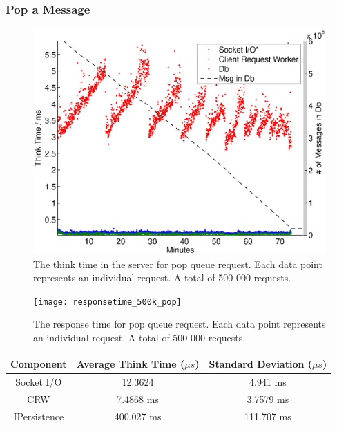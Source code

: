 \documentclass{article}
\begin{document}
        \subsubsection{Pop a Message}
        
			\begin{figure}[H]
                \hspace{-1.5cm}
                \includegraphics[scale=0.50]{thinktime_500k_pop}
                \caption{The think time in the server for pop queue request. Each data point represents an individual request. A total of 500 000 requests.}
                \label{fig:thinktime_500k_pop}
            \end{figure}
            
			\begin{figure}[H]
                \hspace{-1.5cm}
                \texttt{[image: responsetime\_500k\_pop]}
                \caption{The response time for pop queue request. Each data point represents an individual request. A total of 500 000 requests.}
                \label{fig:responsetime_500k_pop}
            \end{figure}
            
            \begin{tabular}{|c|c|c|}
            	\hline 
            \textbf{Component} & \textbf{Average Think Time} ($\mu s$)  & \textbf{Standard Deviation ($\mu s$)} \\ 
            \hline 
            Socket I/O & 12.3624 & 4.941 ms \\ 
            \hline 
            CRW & 7.4868 ms & 3.7579 ms \\ 
            \hline 
            IPersistence & 400.027 ms & 111.707 ms \\ 
            \hline 
            \end{tabular} 
            
\end{document}

